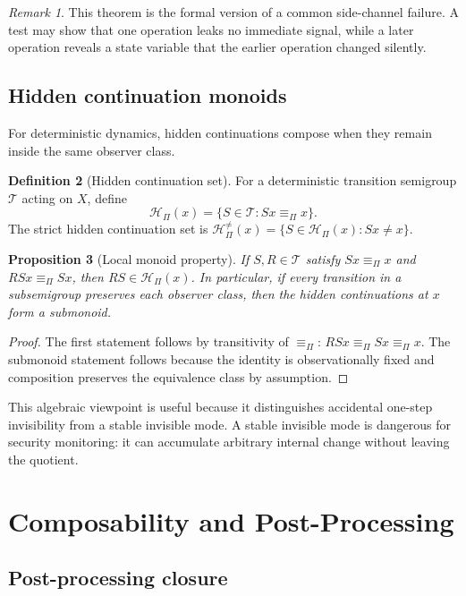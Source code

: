 \documentclass[11pt]{article}
\theoremstyle{definition}
\newtheorem{definition}{Definition}[section]
\theoremstyle{plain}
\newtheorem{proposition}[definition]{Proposition}
\theoremstyle{remark}
\newtheorem{remark}[definition]{Remark}
\newcommand{\cH}{\mathcal{H}}
\newcommand{\cT}{\mathcal{T}}
\newcommand{\eqobs}{\equiv_{\Pi}}
\begin{document}
\begin{remark}
This theorem is the formal version of a common side-channel failure. A test may show that one operation leaks no immediate signal, while a later operation reveals a state variable that the earlier operation changed silently.
\end{remark}

\subsection{Hidden continuation monoids}

For deterministic dynamics, hidden continuations compose when they remain inside the same observer class.

\begin{definition}[Hidden continuation set]
For a deterministic transition semigroup $\cT$ acting on $X$, define
\[
    \cH_{\Pi}(x)=\{S\in\cT:Sx\eqobs x\}.
\]
The strict hidden continuation set is $\cH_{\Pi}^{\ne}(x)=\{S\in\cH_{\Pi}(x):Sx\ne x\}$.
\end{definition}

\begin{proposition}[Local monoid property]
If $S,R\in\cT$ satisfy $Sx\eqobs x$ and $RSx\eqobs Sx$, then $RS\in\cH_{\Pi}(x)$. In particular, if every transition in a subsemigroup preserves each observer class, then the hidden continuations at $x$ form a submonoid.
\end{proposition}

\begin{proof}
The first statement follows by transitivity of $\eqobs$: $RSx\eqobs Sx\eqobs x$. The submonoid statement follows because the identity is observationally fixed and composition preserves the equivalence class by assumption.
\end{proof}

This algebraic viewpoint is useful because it distinguishes accidental one-step invisibility from a stable invisible mode. A stable invisible mode is dangerous for security monitoring: it can accumulate arbitrary internal change without leaving the quotient.

\section{Composability and Post-Processing}

\subsection{Post-processing closure}
\end{document}
